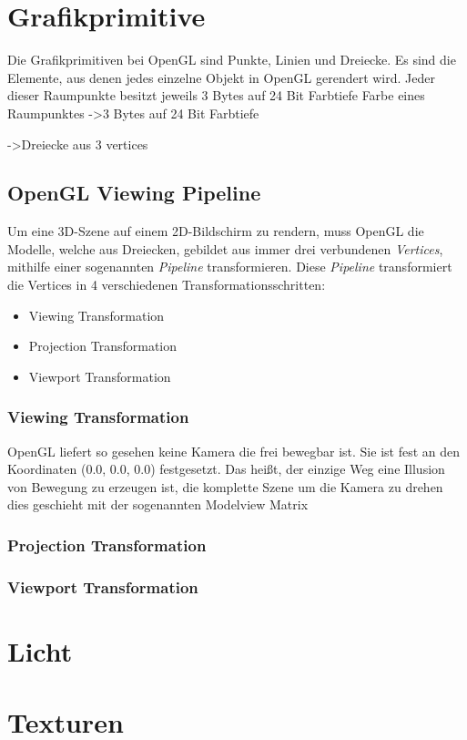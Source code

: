 \section{Grafikprimitive}

Die Grafikprimitiven bei OpenGL sind Punkte, Linien und Dreiecke. Es sind die Elemente, aus denen jedes einzelne Objekt in OpenGL gerendert wird. 
Jeder dieser Raumpunkte besitzt jeweils 3 Bytes auf 24 Bit Farbtiefe
Farbe eines Raumpunktes
->3 Bytes auf 24 Bit Farbtiefe 

->Dreiecke aus 3 vertices 


\subsection{OpenGL Viewing Pipeline}
Um eine 3D-Szene auf einem 2D-Bildschirm zu rendern, muss OpenGL die Modelle, welche aus Dreiecken, gebildet aus immer drei verbundenen \textit{Vertices}, mithilfe einer sogenannten \textit{Pipeline} transformieren. Diese \textit{Pipeline} transformiert die Vertices in 4 verschiedenen Transformationsschritten:

\begin{itemize}
\item Viewing Transformation
\item Projection Transformation
\item Viewport Transformation
\end{itemize}

\subsubsection{Viewing Transformation}
OpenGL liefert so gesehen keine Kamera die frei bewegbar ist. Sie ist fest an den Koordinaten (0.0, 0.0, 0.0) festgesetzt. Das heißt, der einzige Weg eine Illusion von Bewegung zu erzeugen ist, die komplette Szene um die Kamera zu drehen dies geschieht mit der sogenannten Modelview Matrix


\subsubsection{Projection Transformation}

\subsubsection{Viewport Transformation}

\section{Licht}

\section{Texturen}
